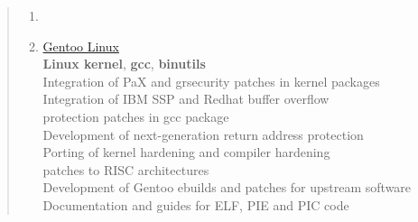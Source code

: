 \documentclass[a4paper]{report}
\begin{document}
\begin{quote}
\begin{enumerate}
\item[]

\item[1999 - 2003]  \href{https://gentoo.org}{Gentoo Linux}\\
                    \textbf{Linux kernel}, \textbf{gcc}, \textbf{binutils}\\
                    Integration of PaX and grsecurity patches in kernel packages\\
                    Integration of IBM SSP and Redhat buffer overflow\\
                    protection patches in gcc package\\
                    Development of next-generation return address protection\\
                    Porting of kernel hardening and compiler hardening\\
                    patches to RISC architectures\\
                    Development of Gentoo ebuilds and patches for upstream software\\
                    Documentation and guides for ELF, PIE and PIC code

\end{enumerate}
\end{quote}
\end{document}
